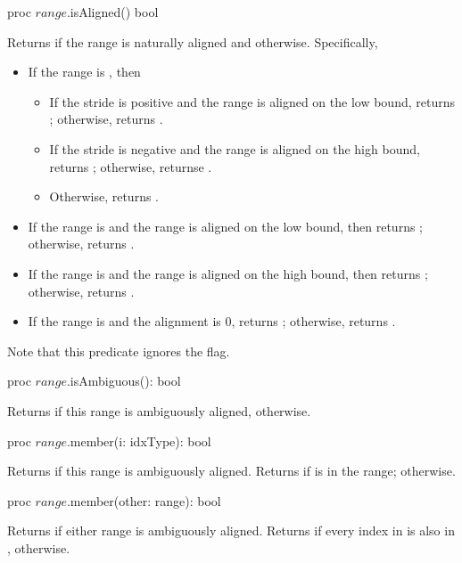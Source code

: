 \begin{protohead}
proc $range$.isAligned() bool
\end{protohead}
\begin{protobody}
Returns  if the range is naturally aligned and  otherwise.
Specifically,
\begin{itemize}
\item If the range is , then
\begin{itemize}
\item If the stride is positive and the range is aligned on the low bound,
returns ; otherwise, returns .
\item If the stride is negative and the range is aligned on the high bound,
returns ; otherwise, returnse .
\item Otherwise, returns .
\end{itemize}
\item If the range is  and the range is aligned on the low
bound, then returns ; otherwise, returns .
\item If the range is  and the range is aligned on the high
bound, then returns ; otherwise, returns .
\item If the range is  and the alignment is 0, returns ;
otherwise, returns .
\end{itemize}
Note that this predicate ignores the  flag.
\end{protobody}

\begin{protohead}
proc $range$.isAmbiguous(): bool
\end{protohead}
\begin{protobody}
Returns  if this range is ambiguously aligned,  otherwise.
\end{protobody}

\begin{protohead}
proc $range$.member(i: idxType): bool
\end{protohead}
\begin{protobody}
Returns  if this range is ambiguously aligned.
Returns  if  is in the range;  otherwise.
\end{protobody}

\begin{protohead}
proc $range$.member(other: range): bool
\end{protohead}
\begin{protobody}
Returns  if either range is ambiguously aligned.
Returns  if every index in  is also in ,  otherwise.
\end{protobody}

